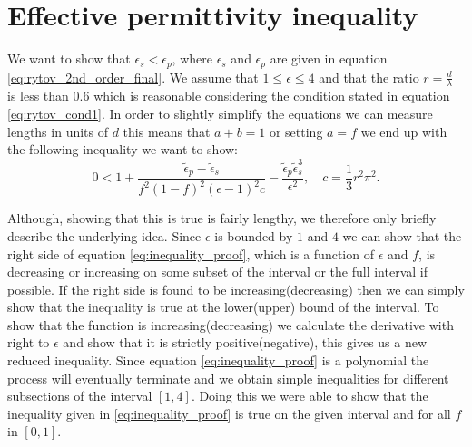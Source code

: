 \section{Effective permittivity inequality}
\label{sec:bf_proof}
We want to show that $\epsilon_{s}<\epsilon_{p}$, where $\epsilon_{s}$ and $\epsilon_{p}$ are given in equation \ref{eq:rytov_2nd_order_final}. We assume that $1\leq\epsilon\leq4$ and that the ratio $r=\frac{d}{\lambda}$ is less than $0.6$ which is reasonable considering the condition stated in equation \ref{eq:rytov_cond1}. In order to slightly simplify the equations we can measure lengths in units of $d$ this means that $a+b=1$ or setting $a=f$ we end up with the following inequality we want to show:
\begin{equation}
    \label{eq:inequality_proof}
    0<1+\frac{\tilde{\epsilon}_{p}-\tilde{\epsilon}_{s}}{f^2(1-f)^2(\epsilon-1)^2c}-\frac{\tilde{\epsilon}_{p}\tilde{\epsilon}_{s}^3}{\epsilon^2},\quad c=\frac{1}{3}r^2\pi^2.
\end{equation}

Although, showing that this is true is fairly lengthy, we therefore only briefly describe the underlying idea. Since $\epsilon$ is bounded by $1$ and $4$ we can show that the right side of equation \ref{eq:inequality_proof}, which is a function of $\epsilon$ and $f$, is decreasing or increasing on some subset of the interval or the full interval if possible. If the right side is found to be increasing(decreasing) then we can simply show that the inequality is true at the lower(upper) bound of the interval. To show that the function is increasing(decreasing) we calculate the derivative with right to $\epsilon$ and show that it is strictly positive(negative), this gives us a new reduced inequality. Since equation \ref{eq:inequality_proof} is a polynomial the process will eventually terminate and we obtain simple inequalities for different subsections of the interval $[1,4]$. Doing this we were able to show that the inequality given in \ref{eq:inequality_proof} is true on the given interval and for all $f$ in $[0,1]$.

